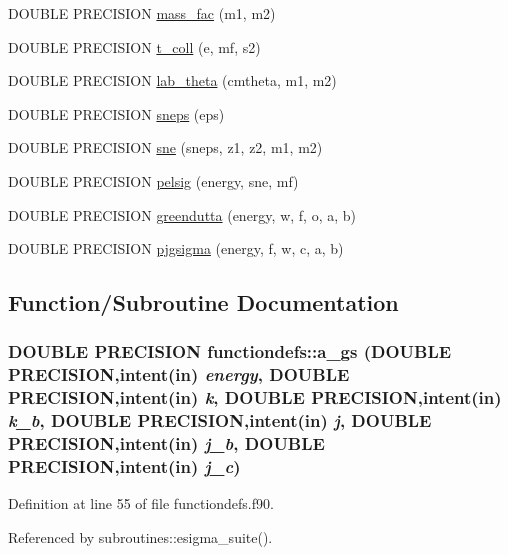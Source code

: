 \begin{DoxyCompactItemize}
DOUBLE PRECISION \hyperlink{namespacefunctiondefs_aa92057c8da0a7ce374166fed435ea54f}{mass\_\-fac} (m1, m2)
\item 
DOUBLE PRECISION \hyperlink{namespacefunctiondefs_a529a6bcbb0305c32f0275aa85d4303e8}{t\_\-coll} (e, mf, s2)
\item 
DOUBLE PRECISION \hyperlink{namespacefunctiondefs_abeba54805575687a8d1db47decf4790e}{lab\_\-theta} (cmtheta, m1, m2)
\item 
DOUBLE PRECISION \hyperlink{namespacefunctiondefs_a80d99fe52a1cb5856694596955d8aeb9}{sneps} (eps)
\item 
DOUBLE PRECISION \hyperlink{namespacefunctiondefs_a78455979576075ad68feb125604462bc}{sne} (sneps, z1, z2, m1, m2)
\item 
DOUBLE PRECISION \hyperlink{namespacefunctiondefs_ae52b03b9e83dd8f46fd7532fb105850b}{pelsig} (energy, sne, mf)
\item 
DOUBLE PRECISION \hyperlink{namespacefunctiondefs_a7a31d88fad502937338eafac9a574fec}{greendutta} (energy, w, f, o, a, b)
\item 
DOUBLE PRECISION \hyperlink{namespacefunctiondefs_a5486e5e48a1c871c2ec9d5bc03406ea5}{pjgsigma} (energy, f, w, c, a, b)
\end{DoxyCompactItemize}


\subsection{Function/Subroutine Documentation}
\hypertarget{namespacefunctiondefs_a9cd4ed9f980bd43386e7de1e3e35c79c}{
\subsubsection[{a\_\-gs}]{\setlength{\rightskip}{0pt plus 5cm}DOUBLE PRECISION functiondefs::a\_\-gs (DOUBLE PRECISION,intent(in) {\em energy}, \/  DOUBLE PRECISION,intent(in) {\em k}, \/  DOUBLE PRECISION,intent(in) {\em k\_\-b}, \/  DOUBLE PRECISION,intent(in) {\em j}, \/  DOUBLE PRECISION,intent(in) {\em j\_\-b}, \/  DOUBLE PRECISION,intent(in) {\em j\_\-c})}}
\label{namespacefunctiondefs_a9cd4ed9f980bd43386e7de1e3e35c79c}


Definition at line 55 of file functiondefs.f90.

Referenced by subroutines::esigma\_\-suite().

